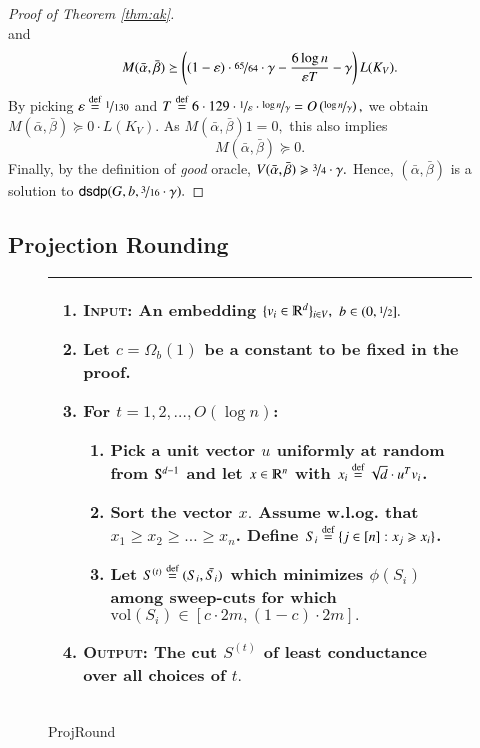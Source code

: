 \documentclass[twoside,leqno,twocolumn]{article}
\newcommand{\nfrac}{\nicefrac}
\renewcommand{\mathbb}{\varmathbb}
\renewcommand{\geq}{\geqslant}
\newcommand{\vol}{\mathrm{vol}}
\newcommand{\defeq}{\stackrel{\textup{def}}{=}}
\newcommand{\R}{\mathbb R}
\newcommand{\e}{\epsilon}
\let\e\varepsilon
\numberwithin{equation}{section}
\newcommand{\dsdp}{{\ensuremath{\mathsf{dsdp}}\xspace}}
\begin{document}
\begin{proof}[Proof of Theorem \ref{thm:ak}]
$$$$
and
$$
M(\bar{\alpha}, \bar{\beta}) \succeq   \left((1-\e) \cdot  \nfrac{65}{64} \cdot \gamma - \frac{6 \log n}{\e T} - \gamma \right)L(K_V).
$$
By picking $\e \defeq \nfrac{1}{130}$ and $T \defeq 6 \cdot 129 \cdot \nfrac{1}{\e} \cdot \nfrac{\log n}{\gamma} = O\left( \nfrac{\log n}{\gamma}\right),$ we obtain $M(\bar{\alpha}, \bar{\beta}) \succeq 0 \cdot L(K_V).$
As $M(\bar{\alpha}, \bar{\beta}) 1 = 0,$ this also implies
$$
M(\bar{\alpha}, \bar{\beta}) \succeq 0.
$$
Finally, by the definition of {\it good} oracle, $V(\bar{\alpha}, \bar{\beta}) \geq \nfrac{3}{4} \cdot \gamma.$ Hence, $(\bar{\alpha}, \bar{\beta})$ is a solution to $\dsdp(G,b, \nfrac{3}{16}\cdot\gamma).$
\end{proof}

\subsection{Projection Rounding}\label{app:round}

\begin{figure*}[h]
  \begin{tabularx}{\textwidth}{|X|}
    \hline
  \begin{enumerate}
  \item {\bf \textsc{Input:}} An embedding $\{v_i \in \R^d \}_{i \in V} ,$ $b\in (0,\nfrac{1}{2}].$
  \item Let $c = \Omega_b(1)$ be a constant to be fixed in the proof. 
\item For $t=1,2, \ldots, O(\log n)$:
\begin{enumerate}
\item Pick a unit vector $u$ uniformly at random from $\mathbb{S}^{d-1}$ and let $x
\in \R^n$ with $x_i \defeq \sqrt{d} \cdot  { u^T v_i}$.
\item Sort the vector $x.$ Assume w.l.og. that $x_1 \geq x_2 \geq \ldots \geq x_n$. Define $S_i \defeq \{j\in [n]:x_j \geq x_i\}$.
   
  \item  Let $S^{(t)} \defeq (S_i,\bar{S_i})$ which minimizes
  $ \phi(S_i)$ among sweep-cuts for which  $\vol(S_i) \in [c\cdot 2m, (1-c)\cdot 2m].$
\end{enumerate}
\item {\bf \textsc{Output:}} The cut $S^{(t)}$ of least conductance over all choices of $t.$ 
  \end{enumerate}\\
   \hline
    \end{tabularx}

  \caption{{\sc ProjRound}}
  \label{fig:rounding}
\end{figure*}
\end{document}
